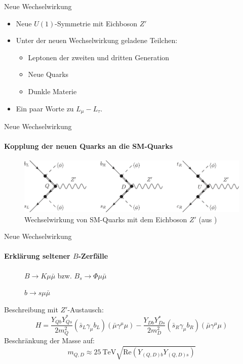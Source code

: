\begin{frame}{Neue Wechselwirkung}
\begin{itemize}
	\setlength\itemsep{1em}
	\item Neue $U(1)$-Symmetrie mit Eichboson $Z'$ \cite{InColour}
	\item Unter der neuen Wechselwirkung geladene Teilchen:
	\begin{itemize}
		\item Leptonen der zweiten und dritten Generation
		\item Neue Quarks
		\item Dunkle Materie \cite{Z}
	\end{itemize}
	\item Ein paar Worte zu $L_\mu-L_\tau$.
\end{itemize}
\end{frame}

\begin{frame}{Neue Wechselwirkung}
\framesubtitle{Kopplung der neuen Quarks an die SM-Quarks}
\begin{figure}
	\includegraphics[width=\textwidth]{Bilder/NeueQuarks.pdf}
	\caption{Wechselwirkung von SM-Quarks mit dem Eichboson $Z'$ (aus \cite{InColour})}
\end{figure}
\end{frame}


\begin{frame}{Neue Wechselwirkung}
\framesubtitle{Erklärung seltener $B$-Zerfälle}
\begin{minipage}{.5\textwidth}
\begin{figure}
	\centering
	\resizebox{\textwidth}{!}{
	
	}
	\caption{$B\rightarrow K\mu\bar{\mu}$ bzw. $B_s\rightarrow \Phi\mu\bar{\mu}$}
\end{figure}
\end{minipage}
\hfill
\begin{minipage}{.45\textwidth}
\begin{figure}
	\centering
	\resizebox{\textwidth}{!}{
		
	}
	\caption{$b\rightarrow s\mu\bar{\mu}$}
\end{figure}
\end{minipage}
Beschreibung mit $Z'$-Austausch:
	\[ H = \frac{Y_{Qb}Y_{Qs}^*}{2m_Q^2}(\bar{s}_L\gamma_\mu b_L)(\bar{\mu}\gamma^\mu\mu)-\frac{Y_{Db}Y_{Ds}^*}{2m_D^2}(\bar{s}_R\gamma_\mu b_R)(\bar{\mu}\gamma^\mu\mu) \]
Beschränkung der Masse auf:
\[ m_{Q,D} \approx \SI{25}{\tera\electronvolt}\sqrt{\text{Re}\left(Y_{(Q,D)b}Y_{(Q,D)s}\right)} \]
\end{frame}


